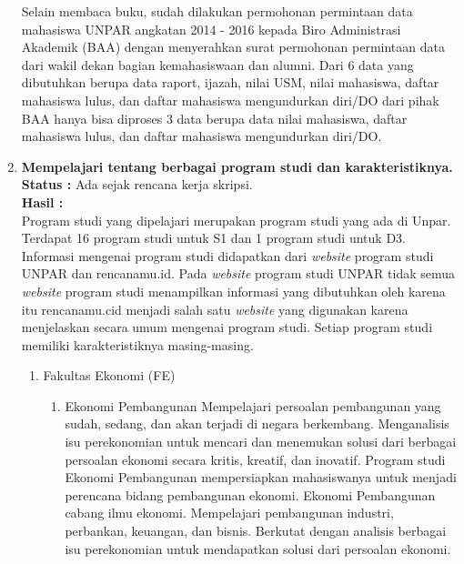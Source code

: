 \documentclass[a4paper,twoside]{article}
\begin{document}
\begin{enumerate}
\begin{enumerate}
		\end{enumerate}
		
	
		
		Selain membaca buku, sudah dilakukan permohonan permintaan data mahasiswa UNPAR angkatan 2014 - 2016 kepada Biro Administrasi Akademik (BAA) dengan menyerahkan surat permohonan permintaan data dari wakil dekan bagian kemahasiswaan dan alumni. Dari 6 data yang dibutuhkan berupa data raport, ijazah, nilai USM, nilai mahasiswa, daftar mahasiswa lulus, dan daftar mahasiswa mengundurkan diri/DO dari pihak BAA hanya bisa diproses 3 data berupa data nilai mahasiswa, daftar mahasiswa lulus, dan daftar mahasiswa mengundurkan diri/DO.
		
\item \textbf{Mempelajari tentang berbagai program studi dan karakteristiknya.}\\
		{\bf Status :} Ada sejak rencana kerja skripsi.\\
		{\bf Hasil :} \\
		Program studi yang dipelajari merupakan program studi yang ada di Unpar. Terdapat 16 program studi untuk S1 dan 1 program studi untuk D3. Informasi mengenai program studi didapatkan dari \textit{website} program studi UNPAR dan rencanamu.id. Pada \textit{website} program studi UNPAR tidak semua \textit{website} program studi menampilkan informasi yang dibutuhkan oleh karena itu rencanamu.cid menjadi salah satu \textit{website} yang digunakan karena menjelaskan secara umum mengenai program studi. Setiap program studi memiliki karakteristiknya masing-masing.
		
		\begin{enumerate}
			\item Fakultas Ekonomi (FE)
			\begin{enumerate}
				\item Ekonomi Pembangunan
					Mempelajari persoalan pembangunan yang sudah, sedang, dan akan terjadi di negara berkembang. Menganalisis isu perekonomian untuk mencari dan menemukan solusi dari berbagai persoalan ekonomi secara kritis, kreatif, dan inovatif. Program studi Ekonomi Pembangunan mempersiapkan mahasiswanya untuk menjadi perencana bidang pembangunan ekonomi. Ekonomi Pembangunan cabang ilmu ekonomi. Mempelajari pembangunan industri, perbankan, keuangan, dan bisnis. Berkutat dengan analisis berbagai isu perekonomian untuk mendapatkan solusi dari persoalan ekonomi.


\end{enumerate}
\end{enumerate}
\end{enumerate}
\end{document}
